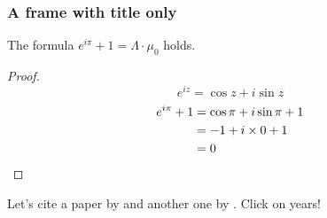 \documentclass{beamer}
\begin{document}
\begin{frame}
      \frametitle{A frame with title only}
      \begin{theorem}
            The formula $e^{i\pi}+1=\Lambda\cdot\mu_0$ holds.
      \end{theorem}
      \begin{proof}
            \begin{equation*}
                  e^{iz}=\cos{z}+i\sin{z}
            \end{equation*}
            \begin{align*}
                  e^{i\pi}+1 & \null=\cos\pi+i\sin\pi+1 \\
                             & \null=-1+i\times0+1      \\
                             & \null=0
            \end{align*}
      \end{proof}

      Let's cite a paper by \cite{amiot_2007_structure_triangulated_categories} and another one by \cite{bergh_jasso_thaule_2016_higher_angulations_local}. \alert{Click on years!}
\end{frame}
\end{document}
